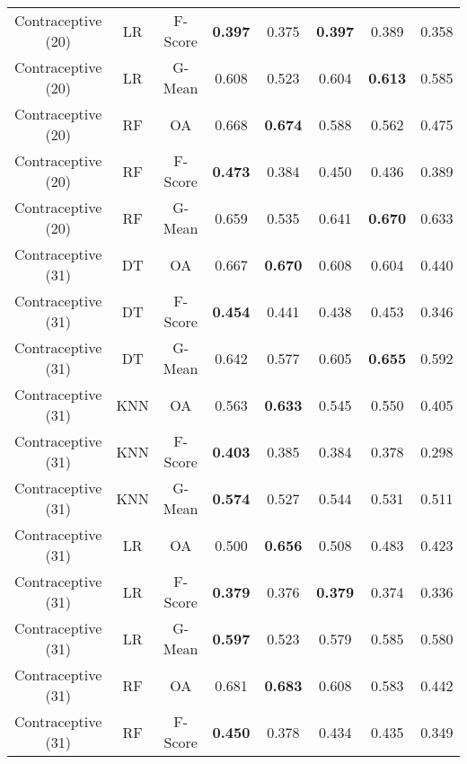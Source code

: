 \begin{longtable}{cccccccc}
Contraceptive (20) &         LR & F-Score & \textbf{0.397} &          0.375 & \textbf{0.397} &          0.389 &          0.358 \\
Contraceptive (20) &         LR &  G-Mean &          0.608 &          0.523 &          0.604 & \textbf{0.613} &          0.585 \\
Contraceptive (20) &         RF &      OA &          0.668 & \textbf{0.674} &          0.588 &          0.562 &          0.475 \\
Contraceptive (20) &         RF & F-Score & \textbf{0.473} &          0.384 &          0.450 &          0.436 &          0.389 \\
Contraceptive (20) &         RF &  G-Mean &          0.659 &          0.535 &          0.641 & \textbf{0.670} &          0.633 \\
Contraceptive (31) &         DT &      OA &          0.667 & \textbf{0.670} &          0.608 &          0.604 &          0.440 \\
Contraceptive (31) &         DT & F-Score & \textbf{0.454} &          0.441 &          0.438 &          0.453 &          0.346 \\
Contraceptive (31) &         DT &  G-Mean &          0.642 &          0.577 &          0.605 & \textbf{0.655} &          0.592 \\
Contraceptive (31) &        KNN &      OA &          0.563 & \textbf{0.633} &          0.545 &          0.550 &          0.405 \\
Contraceptive (31) &        KNN & F-Score & \textbf{0.403} &          0.385 &          0.384 &          0.378 &          0.298 \\
Contraceptive (31) &        KNN &  G-Mean & \textbf{0.574} &          0.527 &          0.544 &          0.531 &          0.511 \\
Contraceptive (31) &         LR &      OA &          0.500 & \textbf{0.656} &          0.508 &          0.483 &          0.423 \\
Contraceptive (31) &         LR & F-Score & \textbf{0.379} &          0.376 & \textbf{0.379} &          0.374 &          0.336 \\
Contraceptive (31) &         LR &  G-Mean & \textbf{0.597} &          0.523 &          0.579 &          0.585 &          0.580 \\
Contraceptive (31) &         RF &      OA &          0.681 & \textbf{0.683} &          0.608 &          0.583 &          0.442 \\
Contraceptive (31) &         RF & F-Score & \textbf{0.450} &          0.378 &          0.434 &          0.435 &          0.349 \\

\end{longtable}

